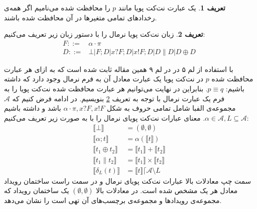 \documentclass[
msc,
irfonts
]{./tex/tehran-thesis}
\newcommand{\پ}{پروژه/پایان‌نامه/رساله }
\theoremstyle{definition}
\newtheorem{definition}{تعریف}[section]
\theoremstyle{theorem}
\theoremstyle{definition}
\numberwithin{algorithm}{chapter}
\newcommand{\sem}[1]{\llbracket #1 \rrbracket}
\newcommand{\e}{\emptyset}
\newcommand{\mc}[1]{\mathcal{#1}}
\begin{document}
\begin{definition}
    یک عبارت نت‌کت پویا مانند
    $p$
    را محافظت‌ شده
    می‌نامیم اگر همه‌ی رخداد‌های تمامی متغیر‌ها در آن محافظت شده باشند.
\end{definition}

\begin{definition}
    \label{def:dynetkat-normal}
    زبان نت‌کت پویا‌ نرمال را با دستور زبان زیر تعریف می‌کنیم:
    \begin{align*}
        F ::= & \alpha\cdot\pi                                          \\
        D ::= & \bot | F;D | x?F;D | x!F;D | D \parallel D | D \oplus D
    \end{align*}
\end{definition}
با استفاده از لم ۵ در 
\cite{dynetkat}
در لم ۹ همین مقاله
ثابت شده است که
به ازای هر عبارت محافظت شده
$p$
در نت‌کت پویا یک عبارت معادل آن به فرم نرمال وجود دارد که داشته باشیم:
$p \equiv q$.
بنابراین در نهایت می‌توانیم هر عبارت محافظت شده نت‌کت پویا را به فرم یک عبارت نرمال
با توجه به تعریف
\ref{def:dynetkat-normal}
بنویسیم.
در ادامه فرض کنیم که
$\mc{A}$
مجموعه‌ی الفبا شامل تمامی حروف به شکل
$\alpha\cdot\pi,x?F,x!F$
باشد و داشته باشیم
$\alpha \in \mc{A}, L \subseteq \mc{A}$.
معنای عبارات نت‌کت پویای نرمال را با به صورت زیر تعریف می‌کنیم:
\begin{align*}
    \sem{\bot}              & = (\e,\e)                               \\
    \sem{\alpha;t}          & = \alpha(\sem{t})                       \\
    \sem{t_1 \oplus t_2}    & = \sem{t_1} + \sem{t_2}                 \\
    \sem{t_1 \parallel t_2} & = \sem{t_1} \times \sem{t_2}            \\
    \sem{\delta_{L}(t)}     & = \sem{t}\lceil \mathcal{A} \setminus L
\end{align*}
سمت چپ معادلات بالا عبارات نت‌کت پویای نرمال و در سمت راست ساختمان رویداد معادل هر یک مشخص شده است.
در معادلات بالا
$(\e,\e)$
یک ساختمان رویداد که مجموعه‌ی رویداد‌ها و مجموعه‌ی برچسب‌های آن تهی است را نشان می‌دهد. 
\end{document}
